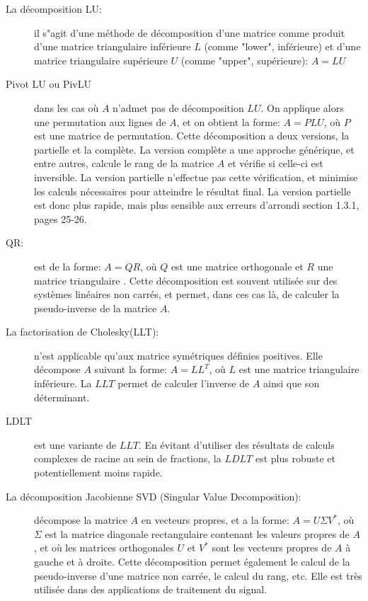 \documentclass{report}
\begin{document}
\begin{description}
\item[La décomposition LU:] il s"agit d'une méthode de décomposition d'une matrice comme produit d'une matrice triangulaire inférieure $L$ (comme "lower", inférieure) et d'une matrice triangulaire supérieure $U$ (comme "upper", supérieure): $A=LU$ \cite[ch.3.2]{bib_matrixComputation}
\item[Pivot LU ou PivLU] dans les cas où $A$ n'admet pas de décomposition $LU$. On applique alors une permutation aux lignes de $A$, et on obtient la forme: $A=PLU$, où $P$ est une matrice de permutation. Cette décomposition a deux versions, la partielle et la complète. La version complète a une approche générique, et entre autres, calcule le rang de la matrice $A$ et vérifie si celle-ci est inversible. La version partielle n'effectue pas cette vérification, et minimise les calculs nécessaires pour atteindre le résultat final. La version partielle est donc plus rapide, mais plus sensible aux erreurs d'arrondi \cite[ch.3.2]{bib_matrixComputation} section 1.3.1, pages 25-26.
\item[QR:] est de la forme: $A=Q R$, où $Q$ est une matrice orthogonale et $R$ une matrice triangulaire \cite[ch.5.2]{bib_matrixComputation}. Cette décomposition est souvent utilisée sur des systèmes linéaires non carrés, et permet, dans ces cas là, de calculer la pseudo-inverse de la matrice $A$.
\item[La factorisation de Cholesky(LLT):] n'est applicable qu'aux matrice symétriques définies positives. Elle décompose $A$ suivant la forme: $A = L L^T$, où $L$ est une matrice triangulaire inférieure. La $LLT$ permet de calculer l'inverse de $A$ ainsi que son déterminant.
\item[LDLT] est une variante de $LLT$. En évitant d'utiliser des résultats de calculs complexes de racine au sein de fractions, la $LDLT$ est plus robuste et potentiellement moins rapide.
\item[La décomposition Jacobienne SVD (Singular Value Decomposition):] décompose la matrice $A$ en vecteurs propres, et a la forme: $A = U \Sigma V^\ast$, où $\Sigma$ est la matrice diagonale rectangulaire contenant les valeurs propres de $A$, et où les matrices orthogonales $U$ et $V^\ast$ sont les vecteurs propres de $A$ à gauche et à droite. Cette décomposition permet également le calcul de la pseudo-inverse d'une matrice non carrée, le calcul du rang, etc. Elle est très utilisée dans des applications de traitement du signal. 
\end{description}
\end{document}
